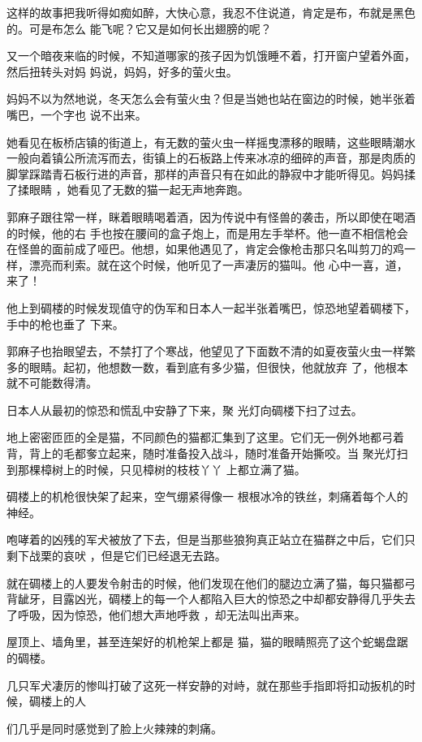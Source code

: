 \documentclass{article}
\begin{document}
这样的故事把我听得如痴如醉，大快心意，我忍不住说道，肯定是布，布就是黑色的。可是布怎么
能飞呢？它又是如何长出翅膀的呢？ 

又一个暗夜来临的时候，不知道哪家的孩子因为饥饿睡不着，打开窗户望着外面，然后扭转头对妈
妈说，妈妈，好多的萤火虫。 

妈妈不以为然地说，冬天怎么会有萤火虫？但是当她也站在窗边的时候，她半张着嘴巴，一个字也
说不出来。 

她看见在板桥店镇的街道上，有无数的萤火虫一样摇曳漂移的眼睛，这些眼睛潮水一般向着镇公所流泻而去，街镇上的石板路上传来冰凉的细碎的声音，那是肉质的脚掌踩踏青石板行进的声音，那样的声音只有在如此的静寂中才能听得见。妈妈揉了揉眼睛
，她看见了无数的猫一起无声地奔跑。 

郭麻子跟往常一样，眯着眼睛喝着酒，因为传说中有怪兽的袭击，所以即使在喝酒的时候，他的右
\newpage
手也按在腰间的盒子炮上，而是用左手举杯。他一直不相信枪会在怪兽的面前成了哑巴。他想，如果他遇见了，肯定会像枪击那只名叫剪刀的鸡一样，漂亮而利索。就在这个时候，他听见了一声凄厉的猫叫。他
心中一喜，道，来了！ 

他上到碉楼的时候发现值守的伪军和日本人一起半张着嘴巴，惊恐地望着碉楼下，手中的枪也垂了
下来。 

郭麻子也抬眼望去，不禁打了个寒战，他望见了下面数不清的如夏夜萤火虫一样繁多的眼睛。起初，他想数一数，看到底有多少猫，但很快，他就放弃
了，他根本就不可能数得清。 

日本人从最初的惊恐和慌乱中安静了下来，聚
光灯向碉楼下扫了过去。 

地上密密匝匝的全是猫，不同颜色的猫都汇集到了这里。它们无一例外地都弓着背，背上的毛都奓立起来，随时准备投入战斗，随时准备开始撕咬。当
\newpage
聚光灯扫到那棵樟树上的时候，只见樟树的枝枝丫丫
上都立满了猫。 

碉楼上的机枪很快架了起来，空气绷紧得像一
根根冰冷的铁丝，刺痛着每个人的神经。 

咆哮着的凶残的军犬被放了下去，但是当那些狼狗真正站立在猫群之中后，它们只剩下战栗的哀吠
，但是它们已经退无去路。 

就在碉楼上的人要发令射击的时候，他们发现在他们的腿边立满了猫，每只猫都弓背龇牙，目露凶光，碉楼上的每一个人都陷入巨大的惊恐之中却都安静得几乎失去了呼吸，因为惊恐，他们想大声地呼救
，却无法叫出声来。 

屋顶上、墙角里，甚至连架好的机枪架上都是
猫，猫的眼睛照亮了这个蛇蝎盘踞的碉楼。 

几只军犬凄厉的惨叫打破了这死一样安静的对峙，就在那些手指即将扣动扳机的时候，碉楼上的人
\newpage

们几乎是同时感觉到了脸上火辣辣的刺痛。 
\end{document}
